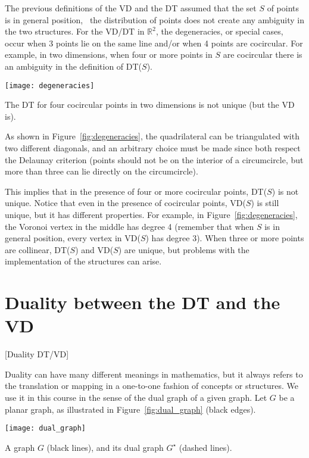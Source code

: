 The previous definitions of the VD and the DT assumed that the set $S$ of points is in general position, \ie\ the distribution of points does not create any ambiguity in the two structures. 
For the VD/DT in $\mathbb{R}^{2}$, the degeneracies, or special cases, occur when 3 points lie on the same line and/or when 4 points are cocircular. 
For example, in two dimensions, when four or more points in $S$ are cocircular there is an ambiguity in the definition of DT($S$). 
\begin{marginfigure}
  \centering
  \texttt{[image: degeneracies]}
  \caption{The DT for four cocircular points in two dimensions is not unique (but the VD is).}%
\label{fig:degeneracies}
\end{marginfigure}
As shown in Figure~\ref{fig:degeneracies}, the quadrilateral can be triangulated with two different diagonals, and an arbitrary choice must be made since both respect the Delaunay criterion (points should not be on the interior of a circumcircle, but more than three can lie directly on the circumcircle).

This implies that in the presence of four or more cocircular points, DT($S$) is not unique. 
Notice that even in the presence of cocircular points, VD($S$) is still unique, but it has different properties. 
For example, in Figure~\ref{fig:degeneracies}, the Voronoi vertex in the middle has degree 4 (remember that when $S$ is in general position, every vertex in VD($S$) has degree 3). 
When three or more points are collinear, DT($S$) and VD($S$) are unique, but problems with the implementation of the structures can arise.


%
\section{Duality between the DT and the VD}[Duality DT/VD]%
\label{sec:duality}

Duality can have many different meanings in mathematics, but it always refers to the translation or mapping in a one-to-one fashion of concepts or structures. 
We use it in this course in the sense of the dual graph of a given graph. 
Let $G$ be a planar graph, as illustrated in Figure~\ref{fig:dual_graph} (black edges).
\begin{marginfigure}
  \centering
  \texttt{[image: dual\_graph]}
  \caption{A graph $G$ (black lines), and its dual graph $G^\star$ (dashed lines).}%
\label{fig:dual_graph}
\end{marginfigure}

